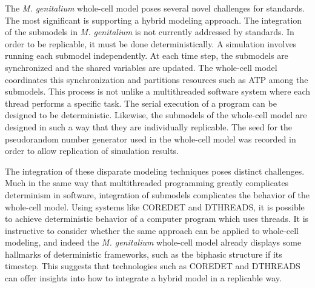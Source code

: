 \documentclass[journal,transmag,twoside]{IEEEtran}
\begin{document}

The \textit{M. genitalium} whole-cell model poses several novel challenges for standards.
The most significant is supporting a hybrid modeling approach.
The integration of the submodels in \textit{M. genitalium} is not currently
addressed by standards. In order to be replicable, it must be done deterministically.
A simulation involves running each submodel independently. At each time step,
the submodels are synchronized and the shared variables are updated.
The whole-cell model coordinates this synchronization and partitions resources such as ATP
among the submodels.
This process is not unlike a multithreaded software system where each thread performs
a specific task. The serial execution of a program can be designed to be deterministic.
Likewise, the submodels of the whole-cell model are designed in such a way that
they are individually replicable. The seed for the pseudorandom number generator
used in the whole-cell model was recorded in order to allow replication of simulation results.

The integration of these disparate modeling techniques poses distinct challenges.
Much in the same way that multithreaded programming greatly complicates
determinism in software, integration of submodels complicates the behavior
of the whole-cell model.
Using systems like C{\small ORE}D{\small ET} and D{\small THREADS}, it is possible
to achieve deterministic behavior of a computer program which uses threads.
It is instructive to consider whether the same approach can be applied to whole-cell
modeling, and indeed the \textit{M. genitalium} whole-cell model already displays
some hallmarks of deterministic frameworks, such as the biphasic structure if its timestep.
This suggests that technologies such as C{\small ORE}D{\small ET} and D{\small THREADS}
can offer insights into how to integrate a hybrid model in a replicable way.
\end{document}
